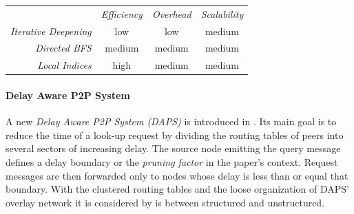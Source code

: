 \begin{center}
\begin{tabular}{rccc}
\multicolumn{1}{r}{} &
\multicolumn{1}{c}{\emph{Efficiency}} &
\multicolumn{1}{c}{\emph{Overhead}} &
\multicolumn{1}{c}{\emph{Scalability}}
\\
\cline{2-4}
\emph{Iterative Deepening} &
low &
low &
% 
medium \\
\emph{Directed BFS} &
medium &
medium &
medium \\
\emph{Local Indices} &
high &
medium &
medium \\
\end{tabular}
\end{center}

\paragraph*{ \bf Delay Aware P2P System}
A new \emph{Delay Aware P2P System (DAPS)} is introduced in \cite{ZL2005}. Its
main goal is to reduce the time of a look-up request by dividing the routing
tables of peers into several sectors of increasing delay. The source node
emitting the query message defines a delay boundary or the \emph{pruning
factor} in the paper's context. Request messages are then forwarded only to
nodes whose delay is less than or equal that boundary. With the clustered
routing tables and the loose organization of DAPS' overlay network it is
considered by is between structured and unstructured.

